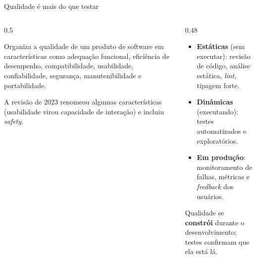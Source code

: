 \begin{frame}{Qualidade é mais do que testar}
  \begin{columns}[T]
    \begin{column}{0.5\textwidth}
      \begin{definicao}
        Organiza a qualidade de um produto de software em características como adequação funcional, eficiência de desempenho, compatibilidade, usabilidade, confiabilidade, segurança, manutenibilidade e portabilidade.
      \end{definicao}
      \begin{dica}
        A revisão de 2023 renomeou algumas características (usabilidade virou capacidade de interação) e incluiu \emph{safety}.
      \end{dica}
    \end{column}
    \begin{column}{0.48\textwidth}
      \begin{conceito}
        \begin{itemize}
          \item \textbf{Estáticas} (sem executar): revisão de código, análise estática, \emph{lint}, tipagem forte.
          \item \textbf{Dinâmicas} (executando): testes automatizados e exploratórios.
          \item \textbf{Em produção}: monitoramento de falhas, métricas e \emph{feedback} dos usuários.
        \end{itemize}
      \end{conceito}
      \begin{destaque}
        Qualidade se \textbf{constrói} durante o desenvolvimento; testes confirmam que ela está lá.
      \end{destaque}
    \end{column}
  \end{columns}
\end{frame}
